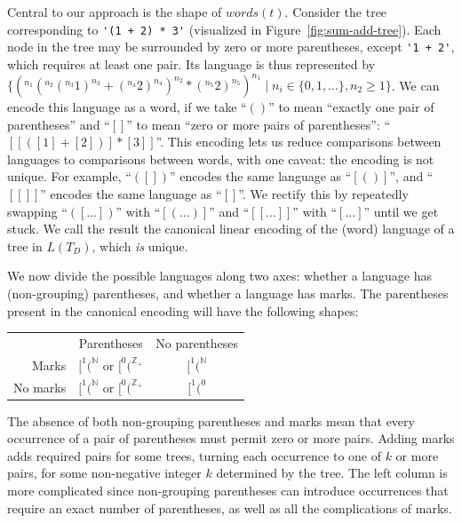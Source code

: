 \documentclass[runningheads]{llncs}
\newcommand{\words}{\mathit{words}} %
\newcommand{\reqpl}{(}
\newcommand{\reqpr}{)}
\newcommand{\reqp}[1]{\reqpl#1\reqpr}
\newcommand{\pospl}{[}
\newcommand{\pospr}{]}
\newcommand{\posp}[1]{\pospl#1\pospr}
\begin{document}
Central to our approach is the shape of $\words(t)$. Consider the tree corresponding to \verb|'(1 + 2) * 3'| (visualized in Figure~\ref{fig:sum-add-tree}). Each node in the tree may be surrounded by zero or more parentheses, except \verb|'1 + 2'|, which requires at least one pair. Its language is thus represented by $\{(^{n_1}(^{n_2}(^{n_3}1)^{n_3} + (^{n_4}2)^{n_4})^{n_2} * (^{n_5}2)^{n_5})^{n_1} \mid n_i \in \{0, 1, \ldots\}, n_2 \geq 1\}$. We can encode this language as a word, if we take ``$\reqp{}$'' to mean ``exactly one pair of parentheses'' and ``$\posp{}$'' to mean ``zero or more pairs of parentheses'': ``$\posp{\posp{\reqp{\posp{1} + \posp{2}}} * \posp{3}}$''. This encoding lets us reduce comparisons between languages to comparisons between words, with one caveat: the encoding is not unique. For example, ``$\reqp{\posp{}}$'' encodes the same language as ``$\posp{\reqp{}}$'', and ``$\posp{\posp{}}$'' encodes the same language as ``$\posp{}$''. We rectify this by repeatedly swapping ``$\reqp{\posp{\ldots}}$'' with ``$\posp{\reqp{\ldots}}$'' and ``$\posp{\posp{\ldots}}$'' with ``$\posp{\ldots}$'' until we get stuck. We call the result the canonical linear encoding of the (word) language of a tree in $L(T_D)$, which \emph{is} unique.

We now divide the possible languages along two axes: whether a language has (non-grouping) parentheses, and whether a language has marks. The parentheses present in the canonical encoding will have the following shapes:

\begin{center}
\begin{tabular}{r@{\quad}c@{\quad}c}
  & Parentheses & No parentheses \\
  \addlinespace
  Marks & $\pospl^1\reqpl^{\mathbb{N}}$ or $\pospl^0\reqpl^{\mathbb{Z}_{+}}$ & $\pospl^1\reqpl^{\mathbb{N}}$ \\
  No marks & $\pospl^1\reqpl^{\mathbb{N}}$ or $\pospl^0\reqpl^{\mathbb{Z}_{+}}$ & $\pospl^1\reqpl^0$ \\
\end{tabular}
\end{center}

\noindent The absence of both non-grouping parentheses and marks mean that every occurrence of a pair of parentheses must permit zero or more pairs. Adding marks adds required pairs for some trees, turning each occurrence to one of $k$ or more pairs, for some non-negative integer $k$ determined by the tree. The left column is more complicated since non-grouping parentheses can introduce occurrences that require an exact number of parentheses, as well as all the complications of marks.
\end{document}
